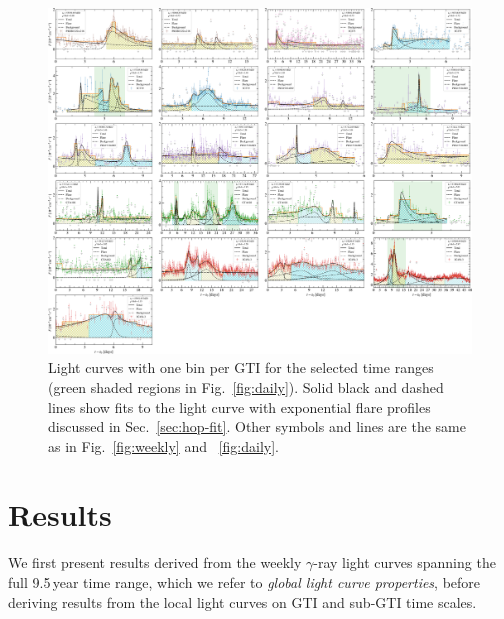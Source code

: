 \documentclass[twocolumn]{aastex62}
\newcommand{\gray}{$\gamma$-ray\xspace}
\begin{document}
\begin{figure}
    \centering
    \includegraphics[width = .99\linewidth]{figures/lcfithop_orbit_all_maxiter2_fsys0p00_addcomp0_comb.pdf}
    \caption{ Light curves with one bin per GTI for the selected time ranges (green shaded regions in Fig.~\ref{fig:daily}). Solid black and dashed lines show fits to the light curve with exponential flare profiles discussed in Sec.~\ref{sec:hop-fit}. Other symbols and lines are the same as in Fig.~\ref{fig:weekly} and ~\ref{fig:daily}.}
    \label{fig:gti}
\end{figure}

\section{Results}
\label{sec:results}
We first present results derived from the weekly \gray light curves spanning the full 9.5\,year time range, which we refer to \emph{global light curve properties}, before deriving results from the local light curves on GTI and sub-GTI time scales.
\end{document}
